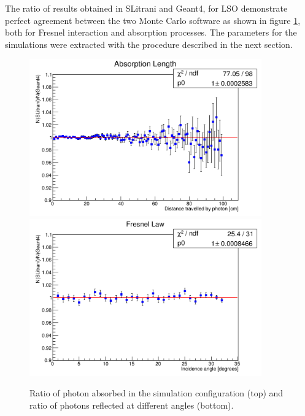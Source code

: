 The ratio of results obtained in SLitrani and Geant4, for LSO demonstrate perfect agreement between the two Monte Carlo software as shown in figure \ref{fig:abs}, both for Fresnel interaction and absorption processes. The parameters for the simulations were extracted with the procedure described in the next section.
\begin{figure}[htbp]
\begin{center}
\includegraphics[width=10cm]{../Pictures/Chapter_5/abs.png}
\includegraphics[width=10cm]{../Pictures/Chapter_5/fresnel.png}
\end{center}
\caption[Geant4 SLitrani absorption and reflection]{Ratio of photon absorbed in the simulation configuration (top) and ratio of photons reflected at different angles (bottom).}
\label{fig:abs}
\end{figure}

